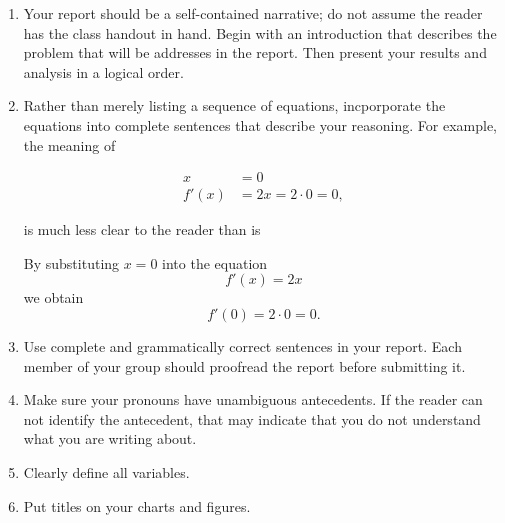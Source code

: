 \documentclass[12pt]{article}
\theoremstyle{definition}
\begin{document}
\begin{enumerate}
	\item Your report should be a self-contained narrative;  do not assume the reader has the class handout in hand.  Begin with an introduction that describes the problem that will be addresses in the report.  Then present your results and analysis in a logical order.
	\item Rather than merely listing a sequence of equations, incporporate the equations into complete sentences that describe your reasoning.  For example, the meaning of 
	\begin{framed}
	\begin{align*}
		x &=0\\
		f'(x) &= 2x = 2\cdot 0 = 0,
	\end{align*}
	\end{framed}
	\noindent is much less clear to the reader than is
\begin{framed}
	\noindent By substituting $x=0$ into the equation
	\[
		f'(x) = 2x
	\]
	we obtain
	\[
		f'(0) = 2\cdot 0 = 0.
	\]
	\end{framed}
	
	\item Use complete and grammatically correct sentences in your report.  Each member of your group should proofread the report before submitting it.  
	
	\item Make sure your pronouns have unambiguous antecedents.  If the reader can not identify the antecedent, that may indicate that you do not understand what you are writing about.
	\item Clearly define all variables. 
	\item Put titles on your charts and figures.
\end{enumerate}
\end{document}
